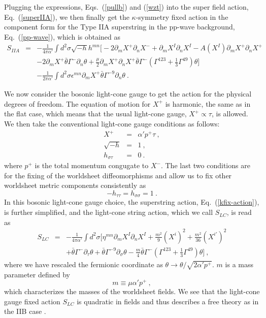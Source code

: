 \documentclass[a4paper,12pt]{article}
\begin{document}
Plugging the expressions, Eqs.~(\ref{pullb}) and (\ref{wzt}) into the
super field action, Eq.~(\ref{superIIA}), we then finally get the
$\kappa$-symmetry fixed action in the component form for the Type IIA
superstring in the pp-wave background, Eq.~(\ref{pp-wave}), which is
obtained as
\begin{eqnarray}
S_{IIA} 
  &=& -\frac{1}{4 \pi \alpha'} \int d^2 \sigma \sqrt{-h} h^{mn}
  \bigg[ -2 \partial_m X^+ \partial_n X^- 
    + \partial_m X^I \partial_n X^I 
    - A(X^I) \partial_m X^+ \partial_n X^+
                         \nonumber \\
  & & -2 \partial_m X^+ \bar{\theta} \Gamma^- \partial_n \theta
      + \frac{\mu}{2} \partial_m X^+ \partial_n X^+
       \bar{\theta} \Gamma^- 
         \left( \Gamma^{123} + \frac{1}{3} \Gamma^{49}
         \right) \theta
  \bigg]    
                         \nonumber \\
  & &  - \frac{1}{2 \pi \alpha'} \int d^2 \sigma
   \epsilon^{mn} \partial_m X^+ \bar{\theta} \Gamma^{-9} 
    \partial_n \theta ~.
\label{kfix-action}
\end{eqnarray}
  
We now consider the bosonic light-cone gauge to get the action for the
physical degrees of freedom.  The equation of motion for $X^+$ is
harmonic, the same as in the flat case, which means that the usual
light-cone gauge, $X^+ \propto \tau$, is allowed.  We then take the
conventional light-cone gauge conditions as follows:
\begin{eqnarray}
X^+  &=& \alpha' p^+ \tau ~,   \nonumber \\
\sqrt{-h} &=& 1 ~,   \nonumber \\
h_{\sigma \tau} &=& 0 ~.
\label{lcg}
\end{eqnarray}
where $p^+$ is the total momentum congugate to $X^-$.  The last two
conditions are for the fixing of the worldsheet diffeomorphisms and
allow us to fix other worldsheet metric components consistently as
\[
- h_{\tau \tau} = h_{\sigma \sigma} = 1 ~.
\]
In this bosonic light-cone gauge choice, the superstring action,
Eq.~(\ref{kfix-action}), is further simplified, and the light-cone
string action, which we call $S_{LC}$, is read as
\begin{eqnarray}
S_{LC} 
 &=& - \frac{1}{4 \pi \alpha'} \int  d^2 \sigma
 \Bigg[ \eta^{mn} \partial_m X^I \partial_n X^I 
      + \frac{m^2}{9} (X^i)^2
      + \frac{m^2}{36} (X^{i'})^2
                       \nonumber \\
 & & + \bar{\theta} \Gamma^- \partial_\tau \theta 
     + \bar{\theta} \Gamma^{-9} \partial_\sigma \theta 
     - \frac{m}{4} \bar{\theta} \Gamma^- 
        \left( \Gamma^{123} + \frac{1}{3} \Gamma^{49} \right)
        \theta  
  \Bigg] ~,
\end{eqnarray}
where we have rescaled the fermionic coordinate as $\theta \rightarrow
\theta / \sqrt{2 \alpha' p^+}$.  $m$ is a mass parameter defined by
\[
 m \equiv \mu \alpha' p^+ ~,
\]
which characterizes the masses of the worldsheet fields.  We see that
the light-cone gauge fixed action $S_{LC}$ is quadratic in fields and
thus describes a free theory as in the IIB case \cite{met044}. 
\end{document}
